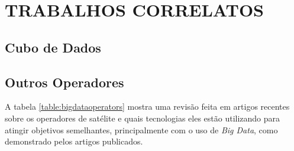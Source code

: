 
\chapter{TRABALHOS CORRELATOS}

\section{Cubo de Dados}

\section{Outros Operadores}

A tabela \ref{table:bigdataoperators} mostra uma revisão feita em artigos recentes sobre os operadores de satélite e quais tecnologias eles estão utilizando para atingir objetivos semelhantes, principalmente com o uso de \textit{Big Data}, como demonstrado pelos artigos publicados.

